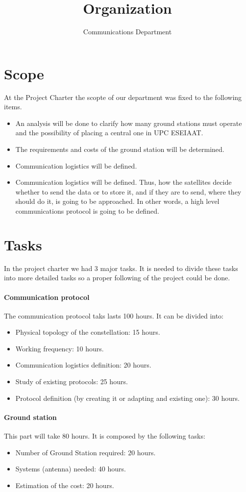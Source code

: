 \documentclass[12pt,a4paper]{article}
\author{Communications Department}
\title{Organization}
\begin{document}
\maketitle
\section{Scope}
At the Project Charter the scopte of our department was fixed to the following items.
\begin{itemize}
\item An analysis will be done to clarify how many ground stations must operate and the possibility of placing a central one in UPC ESEIAAT.
\item The requirements and costs of the ground station will be determined. 
\item Communication logistics will be defined.
\item Communication logistics will be defined. Thus, how the satellites decide whether to send the data or to store it, and if they are to send, where they should do it, is going to be approached. In other words, a high level communications protocol is going to be defined. 
\end{itemize}
\section{Tasks}
In the project charter we had 3 major tasks. It is needed to divide these tasks into more detailed tasks so a proper following of the project could be done. 
\paragraph{Communication protocol}
The communication protocol taks lasts 100 hours. It can be divided into: 
\begin{itemize}
\item Physical topology of the constellation: 15 hours.
\item Working frequency: 10 hours.
\item Communication logistics definition: 20 hours.
\item Study of existing protocols: 25 hours.
\item Protocol definition (by creating it or adapting and existing one): 30 hours.
\end{itemize}
\paragraph{Ground station}
This part will take 80 hours. It is composed by the following tasks:
\begin{itemize}
\item Number of Ground Station required: 20 hours.
\item Systems (antenna) needed: 40 hours.
\item Estimation of the cost: 20 hours.
\end{itemize}
\end{document}

